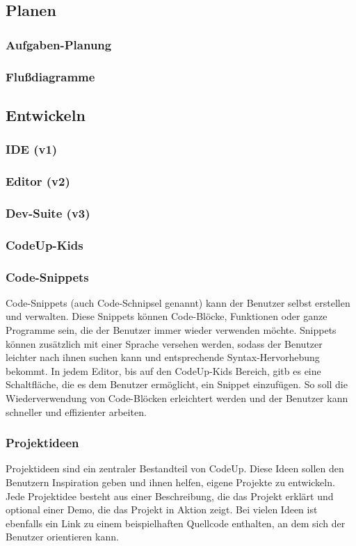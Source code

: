 \documentclass[main.tex]{subfiles}
\begin{document}
    \subsection{Planen}
    \subsubsection{Aufgaben-Planung}
    \subsubsection{Flußdiagramme}
    \subsection{Entwickeln}
    \subsubsection{IDE (v1)}
    \subsubsection{Editor (v2)}
    \subsubsection{Dev-Suite (v3)}
    \subsubsection{CodeUp-Kids}
    \subsubsection{Code-Snippets}
    Code-Snippets (auch Code-Schnipsel genannt) kann der Benutzer selbst erstellen und verwalten.
    Diese Snippets können Code-Blöcke, Funktionen oder ganze Programme sein, die der Benutzer immer wieder verwenden möchte.
    Snippets können zusätzlich mit einer Sprache versehen werden, sodass der Benutzer leichter nach ihnen suchen kann und entsprechende Syntax-Hervorhebung bekommt.
    In jedem Editor, bis auf den CodeUp-Kids Bereich, gitb es eine Schaltfläche, die es dem Benutzer ermöglicht, ein Snippet einzufügen.
    So soll die Wiederverwendung von Code-Blöcken erleichtert werden und der Benutzer kann schneller und effizienter arbeiten.
    \subsubsection{Projektideen}
    Projektideen sind ein zentraler Bestandteil von CodeUp.
    Diese Ideen sollen den Benutzern Inspiration geben und ihnen helfen, eigene Projekte zu entwickeln.
    Jede Projektidee besteht aus einer Beschreibung, die das Projekt erklärt und optional einer Demo, die das Projekt in Aktion zeigt.
    Bei vielen Ideen ist ebenfalls ein Link zu einem beispielhaften Quellcode enthalten, an dem sich der Benutzer orientieren kann.
\end{document}
